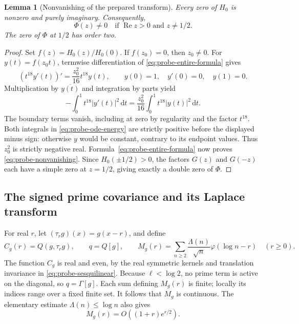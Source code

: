 \documentclass[11pt]{article}
\numberwithin{equation}{section}
\newtheorem{lemma}[theorem]{Lemma}
\theoremstyle{definition}
\theoremstyle{remark}
\newcommand{\Rea}{\operatorname{Re}}
\newcommand{\dd}{\,\mathrm d}
\begin{document}
\begin{lemma}[Nonvanishing of the prepared transform]
\label{lem:probe-nonvanishing}
Every zero of \(H_0\) is nonzero and purely imaginary. Consequently,
\begin{equation}\label{eq:probe-nonvanishing}
\Phi(z)\ne0\quad\text{if }\Rea z>0\text{ and }z\ne1/2.
\end{equation}
The zero of \(\Phi\) at \(1/2\) has order two.
\end{lemma}
\begin{proof}
Set \(f(z)=H_0(z)/H_0(0)\). If \(f(z_0)=0\), then \(z_0\ne0\).
For \(y(t)=f(z_0t)\), termwise differentiation of
\eqref{eq:probe-entire-formula} gives
\[
(t^{18}y'(t))'=\frac{z_0^2}{16}t^{18}y(t),
\qquad y(0)=1,\quad y'(0)=0,\quad y(1)=0.
\]
Multiplication by \(\overline{y(t)}\) and integration by parts yield
\begin{equation}\label{eq:probe-ode-energy}
-\int_0^1t^{18}|y'(t)|^2\dd t
=\frac{z_0^2}{16}\int_0^1t^{18}|y(t)|^2\dd t.
\end{equation}
The boundary terms vanish, including at zero by regularity and the
factor \(t^{18}\). Both integrals in \eqref{eq:probe-ode-energy}
are strictly positive before the displayed minus sign: otherwise
\(y\) would be constant, contrary to its endpoint values.
Thus \(z_0^2\) is strictly negative real.
Formula~\eqref{eq:probe-entire-formula} now proves
\eqref{eq:probe-nonvanishing}. Since \(H_0(\pm1/2)>0\), the factors
\(G(z)\) and \(G(-z)\) each have a simple zero at \(z=1/2\), giving
exactly a double zero of \(\Phi\).
\end{proof}

\subsection{The signed prime covariance and its Laplace transform}
\label{sec:probe-covariance}

For real \(r\), let \((\tau_rg)(x)=g(x-r)\), and define
\begin{equation}\label{eq:probe-covariance-def}
C_g(r)=Q(g,\tau_rg),\qquad q=Q[g],\qquad
M_g(r)=\sum_{n\ge2}\frac{\Lambda(n)}{\sqrt n}
\varphi(\log n-r)\quad(r\ge0).
\end{equation}
The function \(C_g\) is real and even, by the real symmetric kernels
and translation invariance in \eqref{eq:probe-sesquilinear}.
Because \(\ell<\log2\), no prime term is active on the diagonal,
so \(q=\Gamma[g]\). Each sum defining \(M_g(r)\) is finite;
locally its indices range over a fixed finite set. It follows that
\(M_g\) is continuous. The elementary estimate
\(\Lambda(n)\le\log n\) also gives
\begin{equation}\label{eq:probe-elementary-growth}
M_g(r)=O((1+r)e^{r/2}).
\end{equation}
\end{document}
